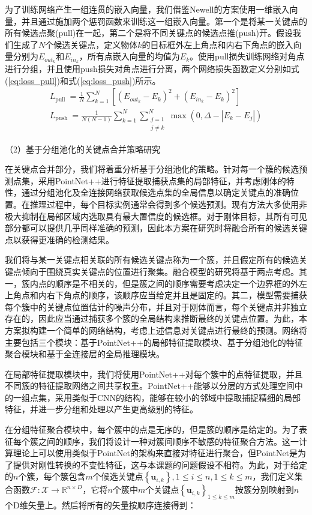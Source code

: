 \documentclass[12pt]{article}
\begin{document}
为了训练网络产生一组连贯的嵌入向量，我们借鉴Newell\cite{Newell2017}的方案使用一维嵌入向量，并且通过施加两个惩罚函数来训练这一组嵌入向量。第一个是将某一关键点的所有候选点聚(pull)在一起，第二个是将不同关键点的候选点推(push)开。假设我们生成了$N$个候选关键点，定义物体$k$的目标框外左上角点和内右下角点的嵌入向量分别为$E_{out_k}$和$E_{in_k}$，所有点嵌入向量的均值为$E_k$。使用pull损失训练网络对角点进行分组，并且使用push损失对角点进行分离，两个网络损失函数定义分别如式(\ref{eq:loss_pull})和式(\ref{eq:loss_push})所示。
\begin{gather}
L_{\text {pull }}=\frac{1}{N} \sum_{k=1}^N\left[\left(E_{out_k}-E_k\right)^2+\left(E_{in_k}-E_k\right)^2\right] 
\label{eq:loss_pull}
\\
L_{\text {push }}=\frac{1}{N(N-1)} \sum_{k=1}^N \sum_{\substack{j=1 \\
j \neq k}}^N \max \left(0, \Delta -\left|E_k-E_j\right|\right)
\label{eq:loss_push}
\end{gather}

（2）基于分组池化的关键点合并策略研究

在关键点合并部分，我们将着重分析基于分组池化的策略。针对每一个簇的候选预测点集，采用PointNet++进行特征提取捕获点集的局部特征，并考虑刚体的特性，通过分组池化及全连接网络获取候选点集的全局信息以确定关键点的准确位置。在推理过程中，每个目标实例通常会得到多个候选预测。现有方法大多使用非极大抑制在局部区域内选取具有最大置信度的候选框。对于刚体目标，其所有可见部分都可以提供几乎同样准确的预测，因此本方案在研究时将融合所有的候选关键点以获得更准确的检测结果。

我们将与某一关键点相关联的所有候选关键点称为一个簇，并且假定所有的候选关键点倾向于围绕真实关键点的位置进行聚集。融合模型的研究将基于两点考虑。其一，簇内点的顺序是不相关的，但是簇之间的顺序需要考虑决定一个边界框的外左上角点和内右下角点的顺序，该顺序应当给定并且是固定的。其二，模型需要捕获每个簇中的关键点位置估计的噪声分布，并且对于刚体而言，每个关键点并非独立存在的，因此应当通过捕获多个簇的全局结构来推断最终的关键点位置。为此，本方案拟构建一个简单的网络结构，考虑上述信息对关键点进行最终的预测。网络将主要包括三个模块：基于PointNet++的局部特征提取模块、基于分组池化的特征聚合模块和基于全连接层的全局推理模块。

在局部特征提取模块中，我们将使用PointNet++对每个簇中的点特征提取，并且不同簇的特征提取网络之间共享权重。PointNet++能够以分层的方式处理空间中的一组点集，采用类似于CNN的结构，能够在较小的邻域中提取捕捉精细的局部特征，并进一步分组和处理以产生更高级别的特征。

在分组特征聚合模块中，每个簇中的点是无序的，但是簇的顺序是给定的。为了表征每个簇之间的顺序，我们将设计一种对簇间顺序不敏感的特征聚合方法。这一计算理论上可以使用类似于PointNet的架构来直接对特征进行聚合，但PointNet是为了提供对刚性转换的不变性特征，这与本课题的问题假设不相符。为此，对于给定的$n$个簇，每个簇包含$m$个候选关键点$\left\{\mathbf{u}_{i,k}\right\}, 1 \leq i \leq n, 1 \leq k \leq m$，我们定义集合函数$\mathcal{F}: \mathcal{X} \rightarrow \mathbb{R}^{n × D}$，它将$n$个簇中$m$个关键点$\left\{\mathbf{u}_{i,k}\right\}_{1 \leq k \leq m}$按簇分别映射到$n$个D维矢量上。然后将所有的矢量按顺序连接得到：
\end{document}
